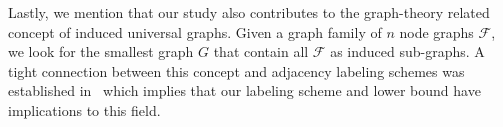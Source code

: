 Lastly, we mention that our study also contributes to    the graph-theory related concept of induced universal graphs. 
Given a  graph family of $n$ node graphs  $\mathcal{F}$, we look for the smallest  graph $G$ that contain all $\mathcal{F}$ as  induced sub-graphs.
A tight connection between this concept and adjacency labeling schemes was established in~\cite{Kannan92} which implies that  our labeling scheme and lower bound have implications to this field.







